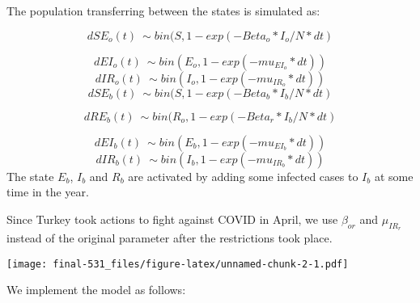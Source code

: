 \documentclass[
]{article}
\newenvironment{Shaded}{\begin{snugshade}}{\end{snugshade}}
\newcommand{\CommentTok}[1]{\textcolor[rgb]{0.56,0.35,0.01}{\textit{#1}}}
\newcommand{\DecValTok}[1]{\textcolor[rgb]{0.00,0.00,0.81}{#1}}
\newcommand{\FunctionTok}[1]{\textcolor[rgb]{0.00,0.00,0.00}{#1}}
\newcommand{\NormalTok}[1]{#1}
\newcommand{\OtherTok}[1]{\textcolor[rgb]{0.56,0.35,0.01}{#1}}
\newcommand{\SpecialCharTok}[1]{\textcolor[rgb]{0.00,0.00,0.00}{#1}}
\newcommand{\StringTok}[1]{\textcolor[rgb]{0.31,0.60,0.02}{#1}}
\begin{document}
The population transferring between the states is simulated as:

\[dSE_o(t) ~\sim bin(S,1-exp(-Beta_o*I_o/N*dt)\]

\[dEI_o(t) ~\sim bin(E_o,1-exp(-mu_{EI_o}*dt))\]
\[dIR_o(t) ~\sim bin(I_o,1-exp(-mu_{IR_o}*dt))\]
\[dSE_b(t) ~\sim bin(S,1-exp(-Beta_b*I_b/N*dt)\]

\[dRE_b(t) ~\sim bin(R_o,1-exp(-Beta_r*I_b/N*dt)\]

\[dEI_b(t) ~\sim bin(E_b,1-exp(-mu_{EI_b}*dt))\]
\[dIR_b(t) ~\sim bin(I_b,1-exp(-mu_{IR_b}*dt))\] The state \(E_b\),
\(I_b\) and \(R_b\) are activated by adding some infected cases to
\(I_b\) at some time in the year.

Since Turkey took actions to fight against COVID in April, we use
\(\beta_{or}\) and \(\mu_{IR_r}\) instead of the original parameter
after the restrictions took place.

\begin{Shaded}
\end{Shaded}

\texttt{[image: final-531\_files/figure-latex/unnamed-chunk-2-1.pdf]}

We implement the model as follows:
\end{document}

